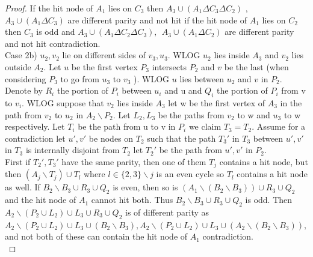 \documentclass[letterpaper,11pt]{article}
\newcommand{\0}{\mathbb{0}}
\newcommand{\1}{\mathbb{1}}
\begin{document}
\begin{proof}
If the hit node of $A_1$ lies on  $C_3$  then $A_3 \cup (A_1 \Delta C_3 \Delta C_2 ) $  , $A_3 \cup (A_1 \Delta C_3  ) $    are different parity and not hit  if the hit node of $A_1 $ lies on $C_2$ then $C_3$ is odd and  $A_3 \cup (A_1 \Delta C_2 \Delta C_3 )   , \  \ A_3 \cup (A_1 \Delta C_2  )  $  are different parity and not hit contradiction. \\
    \indent	Case 2b) $u_2, v_2$ lie on different sides of $v_3, u_3 $.   WLOG $u_2$ lies inside $A_3$ and $v_2$ lies outside $A_2$.   Let $u$  be the first vertex $ P_3$ intersects $P_2 $ and $v$ be the last (when considering $P_3$ to go from $u_3$ to $v_3$ ).
%
WLOG $u$ lies between  $u_2$ and $v$ in $P_2$. Denote by $R_i$ the portion of $P_i$ between $u_i $ and u and $Q_i$ the  portion of $P_i$ from v  to $v_i$.  WLOG suppose that $v_2$ lies inside $A_3$  let w be the first vertex of $A_3$ in the path  from $v_2$ to $u_2$ in $A_2 \backslash P_2$. Let $L_2 , L_3$ be the paths from $ v_2$ to w and $u_3$ to w respectively.  Let $T_i $ be the path from u to v in $P_i$ we claim $T_3= T_2 $. Assume for a contradiction let $u' ,v'$ be nodes on $T_2 $  such that the path $T_3'$ in $T_3$ between $u',v'$ in $T_3$ is internally disjoint from $T_2 $ let $T_2'$ be the path from $u', v'$  in $P_2$. \\
First if $T_2', T_3'$ have the same parity, then one of them $T_j$ contains a hit node, but then $ ( A_j \backslash T_j )  \cup T_l$  where $l \in \{ 2,3 \} \backslash j$  is an  even cycle so $T_l$ contains a hit node as well. If $B_2 \backslash B_3 \cup R_3 \cup Q_2$ is even, then so is $ ( A_1 \backslash  (B_2 \backslash B_3)  ) \cup R_3 \cup Q_2$  and the hit node of $A_1$ cannot hit both.
Thus $B_2 \backslash B_3 \cup R_3 \cup Q_2$ is odd. Then $ A_2 \backslash (P_2 \cup L_2 ) \cup L_3 \cup R_3 \cup Q_2$ is of different parity as $ A_2 \backslash (P_2 \cup L_2 ) \cup L_3 \cup ( B_2 \backslash B_3 ),  A_2 \backslash (P_2 \cup L_2 ) \cup L_3 \cup (A_2 \backslash ( B_2 \backslash B_3 )  ), $ and not both of these can contain the hit node of $A_1$ contradiction.  \\

\end{proof}
\end{document}
